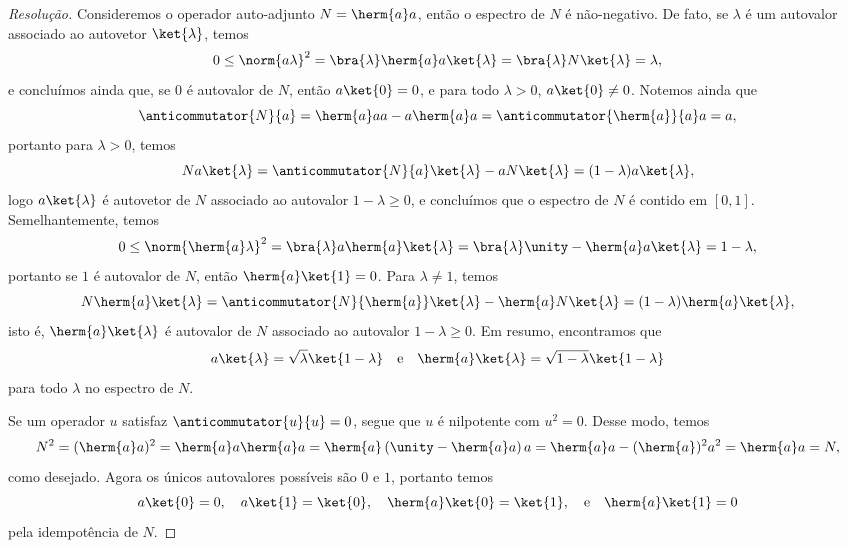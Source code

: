 \begin{proof}[Resolução]
    Consideremos o operador auto-adjunto \(N = \herm{a}a\), então o espectro de \(N\) é não-negativo. De fato, se \(\lambda\) é um autovalor associado ao autovetor \(\ket{\lambda}\), temos
    \begin{equation*}
        0 \leq \norm{a \lambda}^2 = \bra{\lambda}\herm{a}a\ket{\lambda} = \bra{\lambda}N\ket{\lambda} = \lambda,
    \end{equation*}
    e concluímos ainda que, se \(0\) é autovalor de \(N\), então \(a \ket{0} = 0\), e para todo \(\lambda > 0\), \(a\ket{0} \neq 0\). Notemos ainda que
    \begin{equation*}
        \anticommutator{N}{a} = \herm{a}aa - a\herm{a}a = \anticommutator{\herm{a}}{a}a = a,
    \end{equation*}
    portanto para \(\lambda > 0\), temos
    \begin{equation*}
        N a\ket{\lambda} = \anticommutator{N}{a} \ket{\lambda} - a N \ket{\lambda} = (1 - \lambda)a \ket{\lambda},
    \end{equation*}
    logo \(a \ket{\lambda}\) é autovetor de \(N\) associado ao autovalor \(1 - \lambda \geq 0\), e concluímos que o espectro de \(N\) é contido em \([0,1]\). Semelhantemente, temos
    \begin{equation*}
        0 \leq \norm{\herm{a}\lambda}^2 = \bra{\lambda}a\herm{a}\ket{\lambda} = \bra{\lambda}\unity - \herm{a}a\ket{\lambda} = 1 - \lambda,
    \end{equation*}
    portanto se \(1\) é autovalor de \(N\), então \(\herm{a}\ket{1} = 0\). Para \(\lambda\neq 1\), temos
    \begin{equation*}
        N\herm{a}\ket{\lambda} = \anticommutator{N}{\herm{a}}\ket{\lambda} - \herm{a} N \ket{\lambda} = (1 - \lambda)\herm{a}\ket{\lambda},
    \end{equation*}
    isto é, \(\herm{a}\ket{\lambda}\) é autovalor de \(N\) associado ao autovalor \(1 - \lambda \geq 0\). Em resumo, encontramos que
    \begin{equation*}
        a\ket{\lambda} = \sqrt{\lambda} \ket{1-\lambda}\quad\text{e}\quad \herm{a}\ket{\lambda} = \sqrt{1 - \lambda} \ket{1 - \lambda}
    \end{equation*}
    para todo \(\lambda\) no espectro de \(N\).

    Se um operador \(u\) satisfaz \(\anticommutator{u}{u} = 0\), segue que \(u\) é nilpotente com \(u^2 = 0\). Desse modo, temos
    \begin{equation*}
        N^2 = (\herm{a}a)^2 = \herm{a}a\herm{a}a = \herm{a}\left(\unity - \herm{a}a\right)a = \herm{a}a - (\herm{a})^2a^2 = \herm{a}a = N,
    \end{equation*}
    como desejado. Agora os únicos autovalores possíveis são \(0\) e \(1\), portanto temos
    \begin{equation*}
        a\ket{0} = 0,\quad a\ket{1} = \ket{0}, \quad \herm{a}\ket{0} = \ket{1},\quad\text{e}\quad \herm{a}\ket{1} = 0
    \end{equation*}
    pela idempotência de \(N\).
\end{proof}
